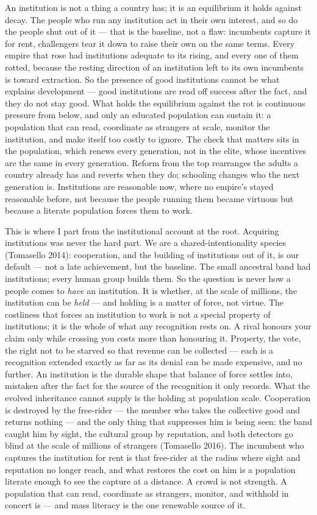 \documentclass[12pt,letterpaper]{article}
\begin{document}
An institution is not a thing a country has; it is an equilibrium it holds against decay. The people who run any institution act in their own interest, and so do the people shut out of it --- that is the baseline, not a flaw: incumbents capture it for rent, challengers tear it down to raise their own on the same terms. Every empire that rose had institutions adequate to its rising, and every one of them rotted, because the resting direction of an institution left to its own incumbents is toward extraction. So the presence of good institutions cannot be what explains development --- good institutions are read off success after the fact, and they do not stay good. What holds the equilibrium against the rot is continuous pressure from below, and only an educated population can sustain it: a population that can read, coordinate as strangers at scale, monitor the institution, and make itself too costly to ignore. The check that matters sits in the population, which renews every generation, not in the elite, whose incentives are the same in every generation. Reform from the top rearranges the adults a country already has and reverts when they do; schooling changes who the next generation is. Institutions are reasonable now, where no empire's stayed reasonable before, not because the people running them became virtuous but because a literate population forces them to work.

This is where I part from the institutional account at the root. Acquiring institutions was never the hard part. We are a shared-intentionality species (Tomasello 2014): cooperation, and the building of institutions out of it, is our default --- not a late achievement, but the baseline. The small ancestral band had institutions; every human group builds them. So the question is never how a people comes to \emph{have} an institution. It is whether, at the scale of millions, the institution can be \emph{held} --- and holding is a matter of force, not virtue. The costliness that forces an institution to work is not a special property of institutions; it is the whole of what any recognition rests on. A rival honours your claim only while crossing you costs more than honouring it. Property, the vote, the right not to be starved so that revenue can be collected --- each is a recognition extended exactly as far as its denial can be made expensive, and no further. An institution is the durable shape that balance of force settles into, mistaken after the fact for the source of the recognition it only records. What the evolved inheritance cannot supply is the holding at population scale. Cooperation is destroyed by the free-rider --- the member who takes the collective good and returns nothing --- and the only thing that suppresses him is being seen: the band caught him by sight, the cultural group by reputation, and both detectors go blind at the scale of millions of strangers (Tomasello 2016). The incumbent who captures the institution for rent is that free-rider at the radius where sight and reputation no longer reach, and what restores the cost on him is a population literate enough to see the capture at a distance. A crowd is not strength. A population that can read, coordinate as strangers, monitor, and withhold in concert is --- and mass literacy is the one renewable source of it.
\end{document}

